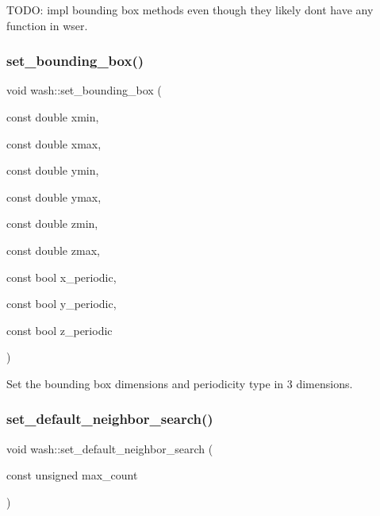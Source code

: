 T\+O\+DO\+: impl bounding box methods even though they likely don\textquotesingle{}t have any function in wser. \mbox{\label{namespacewash_a70aeb215881f159a7efb6da02e5e452b}} 
\subsubsection{\texorpdfstring{set\+\_\+bounding\+\_\+box()}{set\_bounding\_box()}\hspace{0.1cm}{\footnotesize\ttfamily [2/2]}}
{\footnotesize\ttfamily void wash\+::set\+\_\+bounding\+\_\+box (\begin{DoxyParamCaption}\item[{const double}]{xmin,  }\item[{const double}]{xmax,  }\item[{const double}]{ymin,  }\item[{const double}]{ymax,  }\item[{const double}]{zmin,  }\item[{const double}]{zmax,  }\item[{const bool}]{x\+\_\+periodic,  }\item[{const bool}]{y\+\_\+periodic,  }\item[{const bool}]{z\+\_\+periodic }\end{DoxyParamCaption})}



Set the bounding box dimensions and periodicity type in 3 dimensions. 

\mbox{\label{namespacewash_abc2e79908c969eabb61a865c8f279d02}} 
\subsubsection{\texorpdfstring{set\+\_\+default\+\_\+neighbor\+\_\+search()}{set\_default\_neighbor\_search()}}
{\footnotesize\ttfamily void wash\+::set\+\_\+default\+\_\+neighbor\+\_\+search (\begin{DoxyParamCaption}\item[{const unsigned}]{max\+\_\+count }\end{DoxyParamCaption})}



